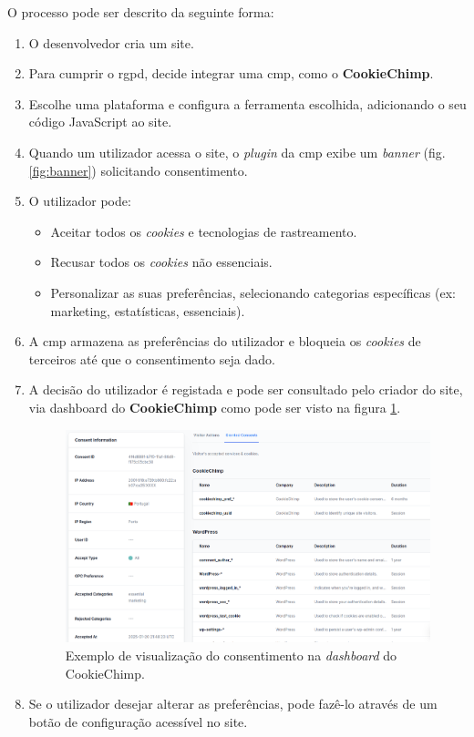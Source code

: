 \newpage

O processo pode ser descrito da seguinte forma:

\begin{enumerate}
    \item O desenvolvedor cria um site.
    \item Para cumprir o \acrshort{rgpd}, decide integrar uma \acrshort{cmp}, como o \textbf{CookieChimp}.
    \item Escolhe uma plataforma e configura a ferramenta escolhida, adicionando o seu código JavaScript ao site.
    \item Quando um utilizador acessa o site, o \textit{plugin} da \acrshort{cmp} exibe um \textit{banner} (fig. \ref{fig:banner}) solicitando consentimento.
    \item O utilizador pode:
          \begin{itemize}
              \item Aceitar todos os \textit{cookies} e tecnologias de rastreamento.
              \item Recusar todos os \textit{cookies} não essenciais.
              \item Personalizar as suas preferências, selecionando categorias específicas (ex: marketing, estatísticas, essenciais).
          \end{itemize}
    \item A \acrshort{cmp} armazena as preferências do utilizador e bloqueia os \textit{cookies} de terceiros até que o consentimento seja dado.
    \item A decisão do utilizador é registada e pode ser consultado pelo criador do site, via dashboard do \textbf{CookieChimp} como pode ser visto na figura \ref{fig:dashboard-visualizacao}.
    \begin{figure}[h]
    \begin{center}
	\includegraphics[width=1.0\textwidth]{images/consent.png}
    \end{center}
    \caption{Exemplo de visualização do consentimento na \textit{dashboard} do CookieChimp.}
    \label{fig:dashboard-visualizacao}
    \end{figure}
    \newpage
    \item Se o utilizador desejar alterar as preferências, pode fazê-lo através de um botão de configuração acessível no site.
\end{enumerate}

